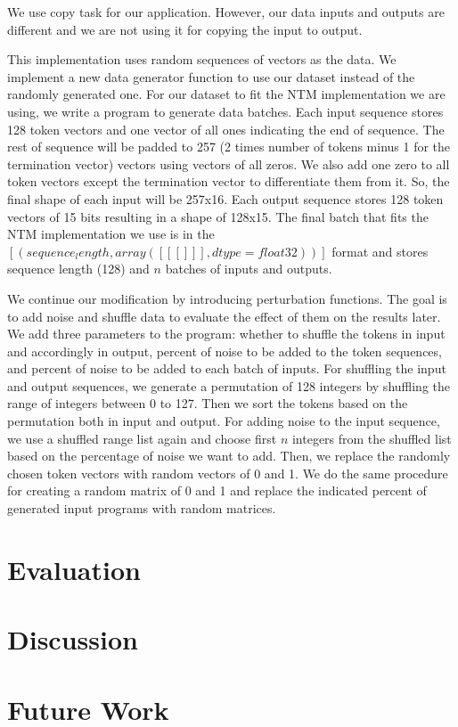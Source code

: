 \documentclass[acmsmall]{acmart}
\begin{document}
We use copy task for our application. However, our data inputs and outputs are different and we are not using it for copying the input to output.

This implementation uses random sequences of vectors as the data. We implement a new data generator function to use our dataset instead of the randomly generated one. For our dataset to fit the NTM implementation we are using, we write a program to generate data batches. Each input sequence stores 128 token vectors and one vector of all ones indicating the end of sequence. The rest of sequence will be padded to 257 (2 times number of tokens minus 1 for the termination vector) vectors using vectors of all zeros. We also add one zero to all token vectors except the termination vector to differentiate them from it. So, the final shape of each input will be 257x16. Each output sequence stores 128 token vectors of 15 bits resulting in a shape of 128x15. The final batch that fits the NTM implementation we use is in the $[(sequence_length, array([[[]]], dtype=float32))]$ format and stores sequence length (128) and $n$ batches of inputs and outputs.

We continue our modification by introducing perturbation functions. The goal is to add noise and shuffle data to evaluate the effect of them on the results later. We add three parameters to the program: whether to shuffle the tokens in input and accordingly in output, percent of noise to be added to the token sequences, and percent of noise to be added to each batch of inputs. For shuffling the input and output sequences, we generate a permutation of 128 integers by shuffling the range of integers between 0 to 127. Then we sort the tokens based on the permutation both in input and output. For adding noise to the input sequence, we use a shuffled range list again and choose first $n$ integers from the shuffled list based on the percentage of noise we want to add. Then, we replace the randomly chosen token vectors with random vectors of 0 and 1. We do the same procedure for creating a random matrix of 0 and 1 and replace the indicated percent of generated input programs with random matrices.
\section{Evaluation}
\section{Discussion}
\section{Future Work}
\end{document}
